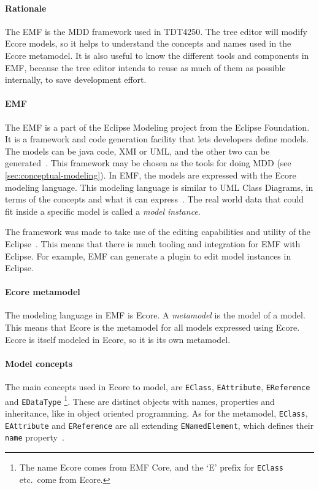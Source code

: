 
\paragraph{Rationale}
The \acrfull{EMF} is the \acrlong{MDD} framework used in \gls{TDT4250}.
The tree editor will modify \gls{Ecore} models, so it helps to understand the concepts and names used in the \gls{Ecore} metamodel.
It is also useful to know the different tools and components in \acrshort{EMF}, because the tree editor intends to reuse as much of them as possible internally, to save development effort.

\paragraph{\acrlong{EMF}}
The \acrfull{EMF} is a part of the Eclipse Modeling project from the Eclipse Foundation.
It is a framework and code generation facility that lets developers define models.
The models can be java code, \gls{XMI} or \gls{UML}, and the other two can be generated~\cite[p.~14]{edmerksEMFEclipseModeling2009}.
This framework may be chosen as the tools for doing \acrlong{MDD} (see \cref{sec:conceptual-modeling}).
In EMF, the models are expressed with the \gls{Ecore} modeling language.
This modeling language is similar to \gls{UML} Class Diagrams, in terms of the concepts and what it can express~\cite[p.~16]{edmerksEMFEclipseModeling2009}.
The real world data that could fit inside a specific model is called a \textit{model instance}.

The framework was made to take use of the editing capabilities and utility of the \gls{Eclipse}~\cite{edmerksEMFEclipseModeling2009}.
This means that there is much tooling and integration for \acrshort{EMF} with \gls{Eclipse}.
For example, EMF can generate a plugin to edit model instances in \gls{Eclipse}.


\paragraph{\Gls{Ecore} metamodel}
The modeling language in \acrshort{EMF} is \gls{Ecore}.
A \textit{metamodel} is the model of a model.
This means that Ecore is the metamodel for all models expressed using \acrshort{Ecore}.
Ecore is itself modeled in Ecore, so it is its own metamodel.


\paragraph{Model concepts}
The main concepts used in \gls{Ecore} to model, are \texttt{EClass}, \texttt{EAttribute}, \texttt{EReference} and \texttt{EDataType}%
\footnote{The name Ecore comes from EMF Core, and the `E' prefix for \texttt{EClass} etc.\ come from Ecore.}.
These are distinct objects with names, properties and inheritance, like in object oriented programming.
As for the metamodel, \texttt{EClass}, \texttt{EAttribute} and \texttt{EReference} are all extending \texttt{ENamedElement}, which defines their \texttt{name} property~\cite{edmerksEMFEclipseModeling2009}.

